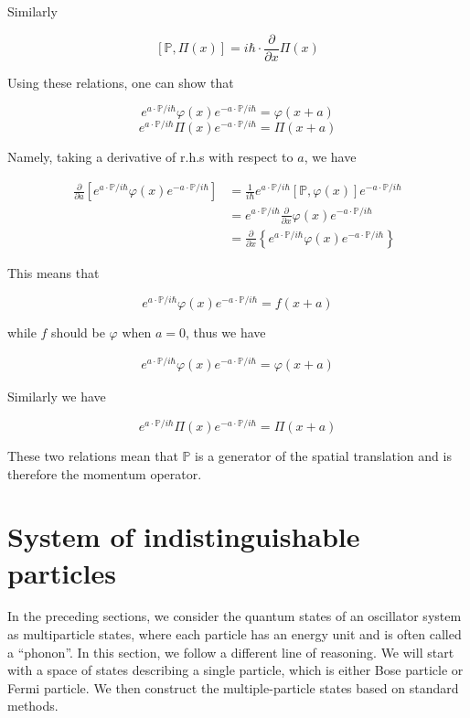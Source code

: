 Similarly

\[[\mathbb{P},\Pi(x)] = i\hbar\cdot\frac{\partial}{\partial x}\Pi(x) \]

Using these relations, one can show that 

\[e^{a\cdot\mathbb{P}/i\hbar}\varphi(x)e^{-a\cdot\mathbb{P}/i\hbar} = \varphi(x+a) \]
\[e^{a\cdot\mathbb{P}/i\hbar}\Pi(x)e^{-a\cdot\mathbb{P}/i\hbar} = \Pi(x+a) \]

Namely, taking a derivative of r.h.s with respect to $a$, we have

\[\begin{split}
\frac{\partial}{\partial a}\left[e^{a\cdot\mathbb{P}/i\hbar}\varphi(x)e^{-a\cdot\mathbb{P}/i\hbar}\right]&=\frac{1}{i\hbar}e^{a\cdot\mathbb{P}/i\hbar}[\mathbb{P},\varphi(x)]e^{-a\cdot\mathbb{P}/i\hbar}\\
&= e^{a\cdot\mathbb{P}/i\hbar}\frac{\partial}{\partial x}\varphi(x)e^{-a\cdot\mathbb{P}/i\hbar}\\
&=\frac{\partial}{\partial x}\left\{e^{a\cdot\mathbb{P}/i\hbar}\varphi(x)e^{-a\cdot\mathbb{P}/i\hbar}\right\}
\end{split}\]

This means that

\[e^{a\cdot\mathbb{P}/i\hbar}\varphi(x)e^{-a\cdot\mathbb{P}/i\hbar} = f(x+a) \]

while $f$ should be $\varphi$ when $a=0$, thus we have

\begin{align}
e^{a\cdot\mathbb{P}/i\hbar}\varphi(x)e^{-a\cdot\mathbb{P}/i\hbar} = \varphi(x+a)
\end{align}

Similarly we have

\[e^{a\cdot\mathbb{P}/i\hbar}\Pi(x)e^{-a\cdot\mathbb{P}/i\hbar} = \Pi(x+a)
\]

These two relations mean that $\mathbb{P}$ is a generator of the spatial translation and is therefore the momentum operator. 


\section{System of indistinguishable particles}

In the preceding sections, we consider the quantum states of an oscillator system as multiparticle states, where each particle has an energy unit and is often called a ``phonon''. In this section, we follow a different line of reasoning. We will start with a space of states describing a single particle, which is either Bose particle or Fermi particle. We then construct the multiple-particle states based on standard methods. 

